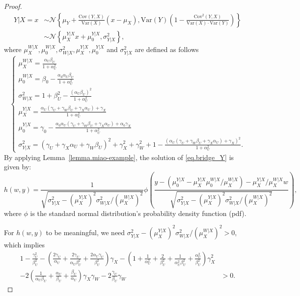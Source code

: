 \documentclass[
  12pt]{article}
\def\cN{\mathcal{N}}
\begin{document}
\begin{proof}
$$\begin{aligned}
    Y|X=x&\sim \cN\left\{ \mu_Y+\frac{\mathrm{Cov}(Y,X)}{\mathrm{Var}(X)}(x-\mu_{X}),\mathrm{Var}(Y)\left( 1-\frac{\mathrm{Cov}^2(Y,X)}{\mathrm{Var}(X)\cdot \mathrm{Var}(Y)} \right) \right\}\nonumber \\
	&\sim \cN\left\{ \mu_{X}^{Y|X}x+\mu_{0}^{Y|X},\sigma_{Y|X}^{2} \right\},
\end{aligned}
$$
where $\mu_{X}^{W|X},\mu_{0}^{W|X},\sigma_{W|X}^{2}, \mu_{X}^{Y|X}, \mu_{0}^{Y|X}$ and $\sigma_{Y|X}^{2}$ are defined as follows
$$
\begin{cases}
	\mu_{X}^{W|X}=\frac{\alpha_U\beta_{U}}{1+\alpha_U^{2}}\\
	\mu_{0}^{W|X}=\beta_0-\frac{\alpha_0\alpha_U\beta_{U}}{1+\alpha_U^{2}}\\
	\sigma_{W|X}^{2}=1+\beta_{U}^{2}-\frac{(\alpha_U\beta_{U})^2}{1+\alpha_U^{2}}\\
	\mu_{X}^{Y|X}=\frac{\alpha_U\left( \gamma_{U}+\gamma_W\beta_{U}+\gamma_X\alpha_U \right) +\gamma_X}{1+\alpha_U^{2}}\\
	\mu_{0}^{Y|X}=\gamma_0-\frac{\alpha_0\alpha_U\left( \gamma_{U}+\gamma_W\beta_{U}+\gamma_X\alpha_U \right) +\alpha_0\gamma_X}{1+\alpha_U^{2}}\\
	\sigma_{Y|X}^{2}=(\gamma_{U}+\gamma_X\alpha_U+\gamma_W\beta_{U})^2+\gamma_X^{2}+\gamma_W^{2}+1-\frac{(\alpha_U\left( \gamma_{U}+\gamma_W\beta_{U}+\gamma_X\alpha_U \right) +\gamma_X)^2}{1+\alpha_U^{2}}.
\end{cases}
$$
By applying Lemma~\ref{lemma.miao-example}, the solution of \eqref{eq.bridge_Y} is given by:
$$
h(w,y)=\frac{1}{\sqrt{\sigma_{Y|X}^{2}-\left(\mu_{X}^{Y|X}\right)^2\sigma_{W|X}^{2}/\left(\mu_{X}^{W|X}\right)^2}}\phi \left( \frac{y-\left( \mu_{0}^{Y|X}-\mu_{X}^{Y|X}\mu_{0}^{W|X}/\mu_{X}^{W|X} \right) -\mu_{X}^{Y|X}/\mu_{X}^{W|X}w}{\sqrt{\sigma_{Y|X}^{2}-\left(\mu_{X}^{Y|X}\right)^2\sigma_{W|X}^{2}/\left(\mu_{X}^{W|X}\right)^2}} \right),
$$
where $\phi$ is the standard normal distribution's probability density function (pdf).

For $h(w, y)$ to be meaningful, we need $\sigma_{Y|X}^{2}-\left(\mu_{X}^{Y|X}\right)^2\sigma_{W|X}^{2}/\left(\mu_{X}^{W|X}\right)^2>0$, which implies
\begin{equation}\label{eq. solution_h_exist}
\begin{aligned}
	1-\frac{\gamma_{U}^{2}}{\beta_{U}^{2}}-\left( \frac{2\gamma_{U}}{\alpha_U}+\frac{2\gamma_{U}}{\alpha_U\beta_{U}^{2}}+\frac{2\alpha_U\gamma_{U}}{\beta_{U}^{2}} \right) \gamma_X-\left( 1+\frac{1}{\alpha_U^{2}}+\frac{2}{\beta_{U}^{2}}+\frac{1}{\alpha_U^{2}\beta_{U}^{2}}+\frac{\alpha_U^{2}}{\beta_{U}^{2}} \right) \gamma_X^{2}\\
	-2\left( \frac{1}{\alpha_U\beta_{U}}+\frac{\alpha_U}{\beta_{U}}+\frac{\beta_{U}}{\alpha_U} \right) \gamma_X\gamma_W-2\frac{\gamma_{U}}{\beta_{U}}\gamma_W&>0.
\end{aligned}
\end{equation}


\end{proof}
\end{document}

